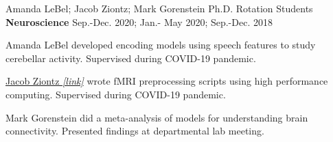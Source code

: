 \begin{cventries}
  \cventry
  	{Amanda LeBel; Jacob Ziontz; Mark Gorenstein}
    {Ph.D. Rotation Students} %
    {\textbf{Neuroscience}}
    {Sep.-Dec. 2020; Jan.- May 2020; Sep.-Dec. 2018} %
   {
      \begin{cvitems} %
        \item {Amanda LeBel developed encoding models using speech features to study cerebellar activity. Supervised during COVID-19 pandemic.}
        \item {{\href{https://docs.google.com/presentation/d/1KqypbxIWP9h1bFufipUan3MAQW_0ZS7i/edit?usp=sharing&ouid=110847987931723045299&rtpof=true&sd=true}{Jacob Ziontz \textit{[link]}}} wrote fMRI preprocessing scripts using high performance computing. Supervised during COVID-19 pandemic.}
        \item {Mark Gorenstein did a meta-analysis of models for understanding brain connectivity. Presented findings at departmental lab meeting.}
      \end{cvitems}
    }
    

\end{cventries}
